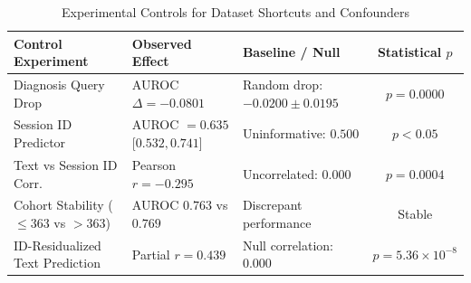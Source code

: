 \begin{table}[t]
\centering
\small
\caption{Experimental Controls for Dataset Shortcuts and Confounders}
\label{tab:shortcut_controls}
\begin{tabular}{p{4.2cm}p{3.8cm}p{3.6cm}c}
\toprule
\textbf{Control Experiment} & \textbf{Observed Effect} & \textbf{Baseline / Null} & \textbf{Statistical $p$} \\
\midrule
Diagnosis Query Drop & AUROC $\Delta = -0.0801$ & Random drop: $-0.0200 \pm 0.0195$ & $p = 0.0000$ \\
Session ID Predictor & AUROC $= 0.635$ [$0.532, 0.741$] & Uninformative: $0.500$ & $p < 0.05$ \\
Text vs Session ID Corr. & Pearson $r = -0.295$ & Uncorrelated: $0.000$ & $p = 0.0004$ \\
Cohort Stability ($\le 363$ vs $>363$) & AUROC $0.763$ vs $0.769$ & Discrepant performance & Stable \\
ID-Residualized Text Prediction & Partial $r = 0.439$ & Null correlation: $0.000$ & $p = 5.36 \times 10^{-8}$ \\
\bottomrule
\end{tabular}
\end{table}
